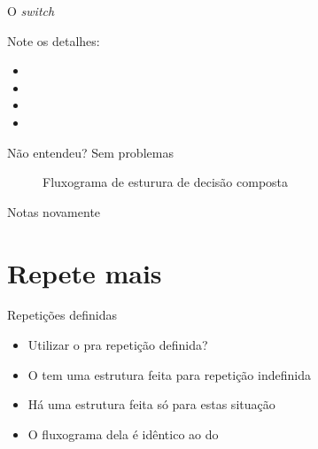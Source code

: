 \documentclass[14pt]{beamer}
\begin{document}
		\begin{frame}{O \textit{switch}}
			\begin{multicols}{2}
				
			\end{multicols}
			Note os detalhes:
			\begin{multicols}{2}
				\begin{itemize}
					\presentationPause\item {}
					\presentationPause\item {}
					\presentationPause\item {}
					\presentationPause\item {}
				\end{itemize}
			\end{multicols}
		\end{frame}

		\begin{frame}{Não entendeu? Sem problemas}
			\begin{figure}[H]
				\centering
				
				\caption{Fluxograma de esturura de decisão composta}
				\label{fig.flow.switch.A}
			\end{figure}
		\end{frame}

		\begin{frame}{Notas novamente}
			
		\end{frame}	

	\section{Repete mais}
		\begin{frame}{Repetições definidas}
			\begin{itemize}
				\presentationPause\item Utilizar o  pra repetição definida?
				\presentationPause\item O  tem uma estrutura feita para repetição indefinida
				\presentationPause\item Há uma estrutura feita só para estas situação
				\presentationPause\item O fluxograma dela é idêntico ao do 
			\end{itemize}
			\presentationPause
		\end{frame}
\end{document}
